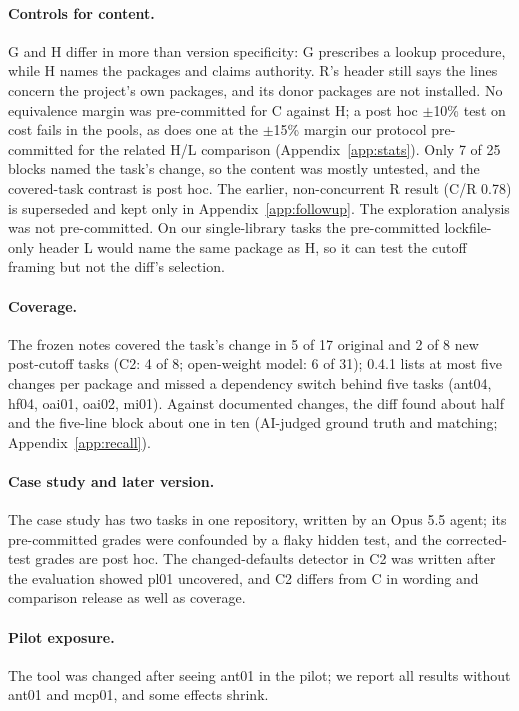 \documentclass[11pt]{article}
\begin{document}
\paragraph{Controls for content.} G and H differ in more than version specificity: G prescribes a lookup procedure, while H names the packages and claims authority. R's header still says the lines concern the project's own packages, and its donor packages are not installed. No equivalence margin was pre-committed for C against H; a post hoc $\pm$10\% test on cost fails in the pools, as does one at the $\pm$15\% margin our protocol pre-committed for the related H/L comparison (Appendix~\ref{app:stats}). Only 7 of 25 blocks named the task's change, so the content was mostly untested, and the covered-task contrast is post hoc. The earlier, non-concurrent R result (C/R 0.78) is superseded and kept only in Appendix~\ref{app:followup}. The exploration analysis was not pre-committed. On our single-library tasks the pre-committed lockfile-only header L would name the same package as H, so it can test the cutoff framing but not the diff's selection.

\paragraph{Coverage.} The frozen notes covered the task's change in 5 of 17 original and 2 of 8 new post-cutoff tasks (C2: 4 of 8; open-weight model: 6 of 31); 0.4.1 lists at most five changes per package and missed a dependency switch behind five tasks (ant04, hf04, oai01, oai02, mi01). Against documented changes, the diff found about half and the five-line block about one in ten (AI-judged ground truth and matching; Appendix~\ref{app:recall}).

\paragraph{Case study and later version.} The case study has two tasks in one repository, written by an Opus 5.5 agent; its pre-committed grades were confounded by a flaky hidden test, and the corrected-test grades are post hoc. The changed-defaults detector in C2 was written after the evaluation showed pl01 uncovered, and C2 differs from C in wording and comparison release as well as coverage.

\paragraph{Pilot exposure.} The tool was changed after seeing ant01 in the pilot; we report all results without ant01 and mcp01, and some effects shrink.
\end{document}
